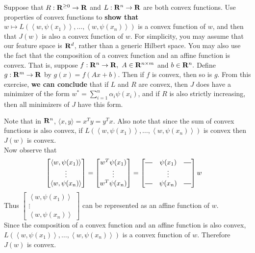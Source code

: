 \documentclass[12pt,letterpaper]{article}
\newcommand*{\horzbar}{\rule[.5ex]{2.5ex}{0.5pt}}
\begin{document}
\begin{problem}{7.3}
Suppose that $R:\mathbf{R}^{\ge0}\to\mathbf{R}$ and $L:\mathbf{R}^{n}\to\mathbf{R}$
are both convex functions. Use properties of convex functions to \textbf{show
that} $w\mapsto L\left(\left\langle w,\psi(x_{1})\right\rangle ,\ldots,\left\langle w,\psi(x_{n})\right\rangle \right)$
is a convex function of $w$, and then that $J(w)$ is also a convex
function of $w$. For simplicity, you may assume that our feature
space is $\mathbf{R}^{d}$, rather than a generic Hilbert space. You may
also use the fact that the composition of a convex function and an
affine function is convex. That is, suppose $f:\mathbf{R}^{n}\to\mathbf{R},\ A\in\mathbf{R}^{n\times m}$
and $b\in\mathbf{R}^{n}.$ Define $g:\mathbf{R}^{m}\to\mathbf{R}$ by $g(x)=f\left(Ax+b\right)$.
Then if $f$ is convex, then so is $g$. From this exercise, \textbf{we
can conclude} that if $L$ and $R$ are convex, then $J$ does have
a minimizer of the form $w^{*}=\sum_{i=1}^{n}\alpha_{i}\psi(x_{i})$,
and if $R$ is also strictly increasing, then all minimizers of $J$
have this form.
\end{problem}
\begin{solution}{}
    Note that in $\mathbf{R}^{n}$, $\langle x,y\rangle = x^Ty = y^Tx$. Also note that since the sum of convex functions is also convex,
    if $L\left(\left\langle w,\psi(x_{1})\right\rangle ,\ldots,\left\langle w,\psi(x_{n})\right\rangle \right)$ is convex then
    $J(w)$ is convex.\\
    Now observe that 
    \begin{align*}
        \begin{bmatrix}
        \left\langle w,\psi(x_{1})\right\rangle\\
        \vdots\\
        \left\langle w,\psi(x_{n})\right\rangle
        \end{bmatrix}
        &= 
        \begin{bmatrix}
        w^T\psi(x_{1})\\
        \vdots\\
        w^T\psi(x_{n})
        \end{bmatrix}
        =
        \begin{bmatrix}
        \horzbar & \psi(x_{1}) & \horzbar\\
        & \vdots\\
        \horzbar & \psi(x_{n}) & \horzbar
        \end{bmatrix}w
    \end{align*}
    Thus $\begin{bmatrix}
        \left\langle w,\psi(x_{1})\right\rangle\\
        \vdots\\
        \left\langle w,\psi(x_{n})\right\rangle
        \end{bmatrix}$
    can be represented as an affine function of $w$.\\
    
    Since the composition of a convex function and an affine function is also convex,\\ $L\left(\left\langle w,\psi(x_{1})\right\rangle ,\ldots,\left\langle w,\psi(x_{n})\right\rangle \right)$ is a convex function of $w$. Therefore $J(w)$ is convex.
\end{solution}
\end{document}
